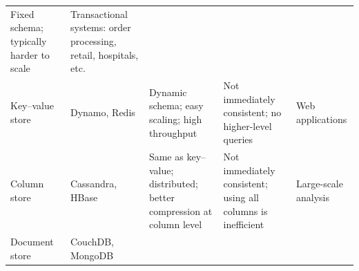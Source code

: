 \documentclass[]{krantz}
\begin{document}
\begin{longtable}[]{@{}lllll@{}}
\begin{minipage}[t]{0.20\columnwidth}
Fixed schema; typically harder to scale\strut
\end{minipage} & \begin{minipage}[t]{0.21\columnwidth}\raggedright\strut
Transactional systems: order processing, retail, hospitals, etc.\strut
\end{minipage}\tabularnewline
\begin{minipage}[t]{0.07\columnwidth}\raggedright\strut
Key--value store\strut
\end{minipage} & \begin{minipage}[t]{0.16\columnwidth}\raggedright\strut
Dynamo, Redis\strut
\end{minipage} & \begin{minipage}[t]{0.22\columnwidth}\raggedright\strut
Dynamic schema; easy scaling; high throughput\strut
\end{minipage} & \begin{minipage}[t]{0.20\columnwidth}\raggedright\strut
Not immediately consistent; no higher-level queries\strut
\end{minipage} & \begin{minipage}[t]{0.21\columnwidth}\raggedright\strut
Web applications\strut
\end{minipage}\tabularnewline
\begin{minipage}[t]{0.07\columnwidth}\raggedright\strut
Column store\strut
\end{minipage} & \begin{minipage}[t]{0.16\columnwidth}\raggedright\strut
Cassandra, HBase\strut
\end{minipage} & \begin{minipage}[t]{0.22\columnwidth}\raggedright\strut
Same as key--value; distributed; better compression at column
level\strut
\end{minipage} & \begin{minipage}[t]{0.20\columnwidth}\raggedright\strut
Not immediately consistent; using all columns is inefficient\strut
\end{minipage} & \begin{minipage}[t]{0.21\columnwidth}\raggedright\strut
Large-scale analysis\strut
\end{minipage}\tabularnewline
\begin{minipage}[t]{0.07\columnwidth}\raggedright\strut
Document store\strut
\end{minipage} & \begin{minipage}[t]{0.16\columnwidth}\raggedright\strut
CouchDB, MongoDB\strut
\end{minipage} & \begin{minipage}[t]{0.22\columnwidth}\raggedright\strut

\end{minipage}
\end{longtable}
\end{document}
